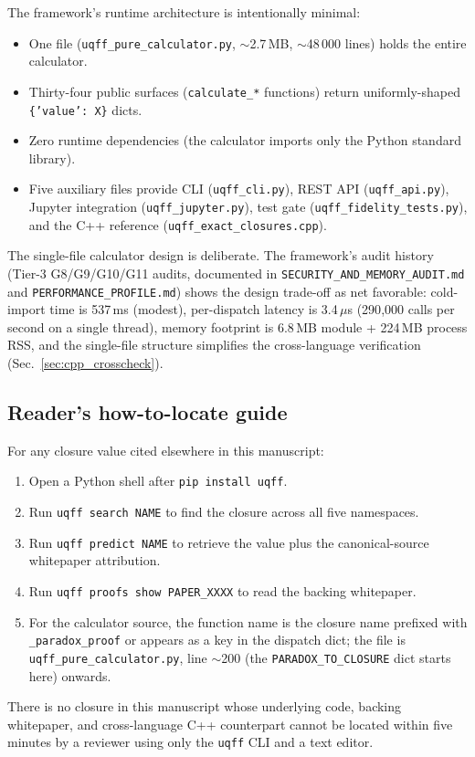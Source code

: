 The framework's runtime architecture is intentionally minimal:

\begin{itemize}
  \item One file (\texttt{uqff\_pure\_calculator.py}, $\sim$2.7\,MB,
        $\sim$48\,000 lines) holds the entire calculator.
  \item Thirty-four public surfaces (\texttt{calculate\_*} functions)
        return uniformly-shaped \texttt{\{'value': X\}} dicts.
  \item Zero runtime dependencies (the calculator imports only the
        Python standard library).
  \item Five auxiliary files provide CLI (\texttt{uqff\_cli.py}),
        REST API (\texttt{uqff\_api.py}), Jupyter integration
        (\texttt{uqff\_jupyter.py}), test gate
        (\texttt{uqff\_fidelity\_tests.py}), and the C++ reference
        (\texttt{uqff\_exact\_closures.cpp}).
\end{itemize}

The single-file calculator design is deliberate. The framework's
audit history (Tier-3 G8/G9/G10/G11 audits, documented in
\texttt{SECURITY\_AND\_MEMORY\_AUDIT.md} and
\texttt{PERFORMANCE\_PROFILE.md}) shows the design trade-off as net
favorable: cold-import time is 537\,ms (modest), per-dispatch latency
is 3.4\,$\mu$s (290{,}000 calls per second on a single thread),
memory footprint is 6.8\,MB module + 224\,MB process RSS, and the
single-file structure simplifies the cross-language verification
(Sec.~\ref{sec:cpp_crosscheck}).

\subsection{Reader's how-to-locate guide}
\label{sec:how_to_locate}

For any closure value cited elsewhere in this manuscript:

\begin{enumerate}
  \item Open a Python shell after \texttt{pip install uqff}.
  \item Run \texttt{uqff search NAME} to find the closure across
        all five namespaces.
  \item Run \texttt{uqff predict NAME} to retrieve the value plus
        the canonical-source whitepaper attribution.
  \item Run \texttt{uqff proofs show PAPER\_XXXX} to read the
        backing whitepaper.
  \item For the calculator source, the function name is the
        closure name prefixed with \texttt{\_paradox\_proof} or
        appears as a key in the dispatch dict; the file is
        \texttt{uqff\_pure\_calculator.py}, line $\sim$200 (the
        \texttt{PARADOX\_TO\_CLOSURE} dict starts here) onwards.
\end{enumerate}

There is no closure in this manuscript whose underlying code,
backing whitepaper, and cross-language C++ counterpart cannot be
located within five minutes by a reviewer using only the
\texttt{uqff} CLI and a text editor.

